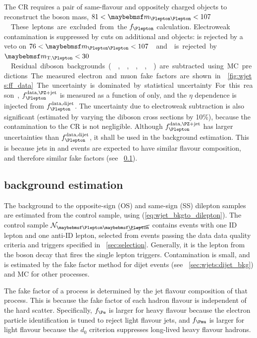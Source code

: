 The \Zjets CR requires a pair of same-flavour and oppositely charged \id{\Plepton} objects 
to reconstruct the \PZ boson mass, \unit{$81 < \mll < 107$}{\GeV}. These leptons are 
excluded from the $f_{\Plepton}$ calculation. Electroweak contamination is suppressed by 
cuts on additional \id{\Plepton} and \antiid{\Plepton} objects: \ZZ is rejected by a veto 
on \unit{$76 < \mll < 107$}{\GeV} and \WZ is rejected by \unit{$\mtw < 30$}{\GeV}. Residual 
diboson backgrounds (\Zgamma, \ZZ, \Zgstar, \WZ, \Wgstar) are subtracted using MC 
predictions.

The measured electron and muon fake factors are shown in \Figure~\ref{fig:wjets:ff_data}. 
The uncertainty is dominated by statistical uncertainty. For this reason, 
$f_{\Plepton}^{\text{data,\Zjets}}$ is measured as a function of \pt only, and the $\eta$ 
dependence is injected from $f_{\Plepton}^{\text{data,dijet}}$. The uncertainty due to 
electroweak subtraction is also significant (estimated by varying the diboson cross 
sections by 10\%), because the contamination to the \Zjets CR is not negligible. Although 
$f_{\Plepton}^{\text{data,\Zjets}}$ has larger uncertainties than 
$f_{\Plepton}^{\text{data,dijet}}$, it shall be used in the \Wjets background estimation. 
This is because jets in \Zjets and \Wjets events are expected to have similar flavour 
composition, and therefore similar fake factors (see \Section~\ref{sec:wjets:wjet_bkg}).



\subsection{\Wjets background estimation}
\label{sec:wjets:wjet_bkg}

The \Wjets background to the opposite-sign (OS) and same-sign (SS) dilepton samples are 
estimated from the \Wjets control sample, using (\ref{eq:wjet_bkgto_dilepton}). The 
\Wjets control sample $\mathcal{N}_{\id{\Plepton}\antiid{\Plepton}}$ contains events with 
one ID lepton and one anti-ID lepton, selected from events passing the data data quality 
criteria and triggers specified in \Section~\ref{sec:selection}. Generally, it is the 
lepton from the \PW boson decay that fires the single lepton triggers. Contamination is 
small, and is estimated by the fake factor method for dijet events (see 
\Section~\ref{sec:wjets:dijet_bkg}) and MC for other processes.

The fake factor of a process is determined by the jet flavour composition of that 
process. This is because the fake factor of each hadron flavour is independent of 
the hard scatter. Specifically, $f_{\Pe}$ is larger for heavy flavour because the electron 
particle identification is tuned to reject light flavour jets, and $f_{\Pmu}$ is larger 
for light flavour because the $d_0$ criterion suppresses long-lived heavy flavour hadrons.

